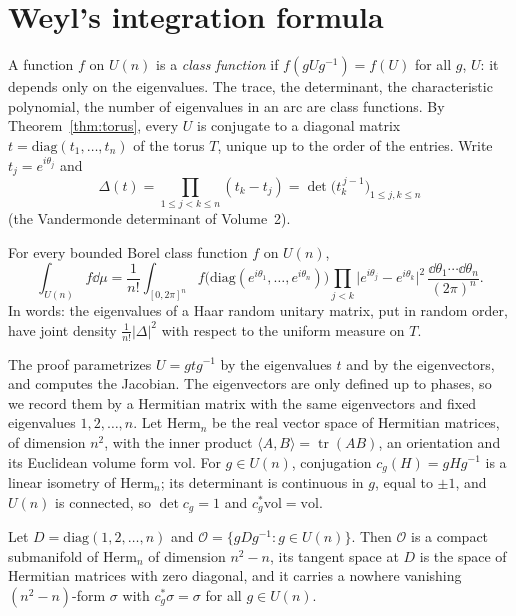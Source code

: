 \section{Weyl's integration formula}

A function $f$ on $U(n)$ is a \emph{class function} if $f(gUg^{-1})=f(U)$ for all $g$, $U$: it depends only on the eigenvalues. The trace, the determinant, the characteristic polynomial, the
number of eigenvalues in an arc are class functions. By Theorem~\ref{thm:torus}, every $U$ is conjugate to a diagonal matrix $t=\mathrm{diag}(t_1,\dots,t_n)$ of the torus $T$, unique up to
the order of the entries. Write $t_j=e^{i\theta_j}$ and
\[\Delta(t)=\prod_{1\le j<k\le n}(t_k-t_j)=\det\bigl(t_k^{\,j-1}\bigr)_{1\le j,k\le n}\]
(the Vandermonde determinant of Volume~2).

\begin{theorem}[Weyl, 1925]\label{thm:weyl}
For every bounded Borel class function $f$ on $U(n)$,
\[\int_{U(n)}f\dd\mu=\frac1{n!}\int_{[0,2\pi]^n}f\bigl(\mathrm{diag}(e^{i\theta_1},\dots,e^{i\theta_n})\bigr)\prod_{j<k}\bigl|e^{i\theta_j}-e^{i\theta_k}\bigr|^2\,\frac{\dd\theta_1\cdots\dd\theta_n}{(2\pi)^n}.\]
In words: the eigenvalues of a Haar random unitary matrix, put in random order, have joint density $\frac1{n!}|\Delta|^2$ with respect to the uniform measure on $T$.
\end{theorem}

The proof parametrizes $U=gtg^{-1}$ by the eigenvalues $t$ and by the eigenvectors, and computes the Jacobian. The eigenvectors are only defined up to phases, so we record them by a
Hermitian matrix with the same eigenvectors and fixed eigenvalues $1,2,\dots,n$. Let $\mathrm{Herm}_n$ be the real vector space of Hermitian matrices, of dimension $n^2$, with the inner product
$\langle A,B\rangle=\operatorname{tr}(AB)$, an orientation and its Euclidean volume form $\mathrm{vol}$. For $g\in U(n)$, conjugation $c_g(H)=gHg^{-1}$ is a linear isometry of $\mathrm{Herm}_n$; its
determinant is continuous in $g$, equal to $\pm1$, and $U(n)$ is connected, so $\det c_g=1$ and $c_g^*\mathrm{vol}=\mathrm{vol}$.

\begin{lemma}\label{lem:orbit}
Let $D=\mathrm{diag}(1,2,\dots,n)$ and $\mathcal O=\{gDg^{-1}:g\in U(n)\}$. Then $\mathcal O$ is a compact submanifold of $\mathrm{Herm}_n$ of dimension $n^2-n$, its tangent space at $D$ is the space
of Hermitian matrices with zero diagonal, and it carries a nowhere vanishing $(n^2-n)$-form $\sigma$ with $c_g^*\sigma=\sigma$ for all $g\in U(n)$.
\end{lemma}

